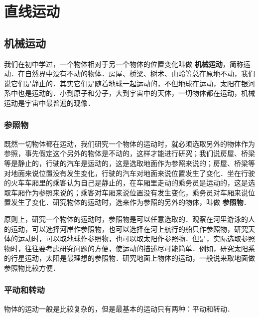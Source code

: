 \chapter{直线运动}

\section{机械运动}

我们在初中学过，一个物体相对于另一个物体的位置变化叫做\textbf{ 机械运动}，简称运动．在自然界中没有不动的物体．房屋、桥梁、树术、山岭等总在原地不动，我们说它们是静止的．其实它们是随着地球一起运动的，不但地球在运动，太阳在银河系中也是运动的．小到原子和分子，大到宇宙中的天体，一切物体都在运动，机械运动是宇宙中最普遍的现像．
\subsection{参照物}
既然一切物体都在运动，我们研究一个物体的运动时，就必须选取另外的物体作为参照，事先假定这个另外的物体是不动的，这样才能进行研究；我们说房屋、桥梁等是静止的，行驶的汽车是运动的，这是选取地面作为参照来说的；房屋、桥梁等对地面来说位置没有发生变化，行驶的汽车对地面来说位置发生了变化．坐在行驶的火车车厢里的乘客认为自己是静止的，在车厢里走动的乘务员是运动的，这是选取车厢作为参照来说的；乘客对车厢来说位置没有发生变化，乘务员对车厢来说位置发生了变化．研究物体的运动时，选来作为参照的另外的物体，叫做\textbf{ 参照物}．

原则上，研究一个物体的运动时，参照物是可以任意选取的．观察在河里游泳的人的运动，可以选择河岸作参照物，也可以选择在河上航行的船只作参照物，研究天体的运动时，可以取地球作参照物，也可以取太阳作参照物．但是，实际选取参照物时，往往要考虑研究问题的方便，使运动的描述尽可能简单．例如，研究太阳系的行星运动，太阳是最理想的参照物．研究地面上物体的运动，一般说来取地面做参照物比较方便．

\subsection{平动和转动}

物体的运动一般是比较复杂的，但是最基本的运动只有两种：平动和转动．

